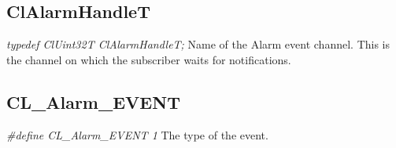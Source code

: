 \begin{flushleft}
\subsection{ClAlarmHandleT}

\textit{typedef ClUint32T ClAlarmHandleT;}
\newline
\newline
Name of the Alarm event channel. This is the channel on which the subscriber waits for notifications. 


\subsection{CL\_\-Alarm\_\-EVENT}
\textit{\#define CL\_\-Alarm\_\-EVENT 1}
\newline
\newline
The type of the event. 







\end{flushleft}
